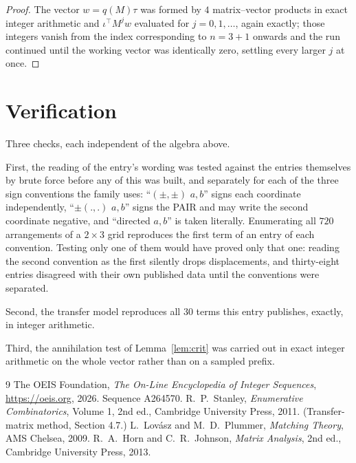 \documentclass[11pt,a4paper]{article}
\theoremstyle{plain}
\theoremstyle{definition}
\begin{document}
\begin{proof}
The vector $w=q(M)\tau$ was formed by $4$ matrix--vector products in exact integer
arithmetic and $\iota^{\!\top}M^{j}w$ evaluated for $j=0,1,\dots$, again exactly; those
integers vanish from the index corresponding to $n=3+1$ onwards and the run continued
until the working vector was identically zero, settling every larger $j$ at once.
\end{proof}

\section{Verification}

Three checks, each independent of the algebra above.

First, the reading of the entry's wording was tested against the entries themselves by brute
force before any of this was built, and separately for each of the three sign conventions the
family uses: ``$(\pm,\pm)$ $a,b$'' signs each coordinate independently, ``$\pm(.,.)$ $a,b$''
signs the PAIR and may write the second coordinate negative, and ``directed $a,b$'' is taken
literally. Enumerating all $720$ arrangements of a $2\times3$ grid reproduces the first term
of an entry of each convention. Testing only one of them would have proved only that one:
reading the second convention as the first silently drops displacements, and thirty-eight
entries disagreed with their own published data until the conventions were separated.

Second, the transfer model reproduces all $30$ terms this entry publishes, exactly, in
integer arithmetic.

Third, the annihilation test of Lemma~\ref{lem:crit} was carried out in exact integer
arithmetic on the whole vector rather than on a sampled prefix.

\begin{thebibliography}{9}
 The OEIS Foundation, \emph{The On-Line Encyclopedia of Integer
Sequences}, \url{https://oeis.org}, 2026. Sequence A264570.
 R.~P.~Stanley, \emph{Enumerative Combinatorics}, Volume 1, 2nd ed.,
Cambridge University Press, 2011. (Transfer-matrix method, Section 4.7.)
 L.~Lov\'asz and M.~D.~Plummer, \emph{Matching Theory}, AMS Chelsea, 2009.
 R.~A.~Horn and C.~R.~Johnson, \emph{Matrix Analysis}, 2nd ed., Cambridge
University Press, 2013.
\end{thebibliography}
\end{document}
